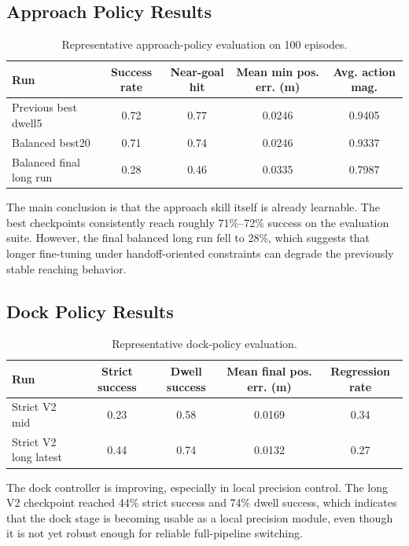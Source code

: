 \documentclass[11pt]{article}
\begin{document}
\subsection{Approach Policy Results}

\begin{table}[H]
\centering
\begin{tabularx}{\textwidth}{>{\raggedright\arraybackslash}p{} c c c c}
\toprule
Run & Success rate & Near-goal hit & Mean min pos. err. (m) & Avg. action mag. \\
\midrule
Previous best dwell5 & 0.72 & 0.77 & 0.0246 & 0.9405 \\
Balanced best20 & 0.71 & 0.74 & 0.0246 & 0.9337 \\
Balanced final long run & 0.28 & 0.46 & 0.0335 & 0.7987 \\
\bottomrule
\end{tabularx}
\caption{Representative approach-policy evaluation on 100 episodes.}
\end{table}

The main conclusion is that the approach skill itself is already learnable. The best checkpoints consistently reach roughly 71\%--72\% success on the evaluation suite. However, the final balanced long run fell to 28\%, which suggests that longer fine-tuning under handoff-oriented constraints can degrade the previously stable reaching behavior.

\subsection{Dock Policy Results}

\begin{table}[H]
\centering
\begin{tabularx}{\textwidth}{>{\raggedright\arraybackslash}p{} c c c c}
\toprule
Run & Strict success & Dwell success & Mean final pos. err. (m) & Regression rate \\
\midrule
Strict V2 mid & 0.23 & 0.58 & 0.0169 & 0.34 \\
Strict V2 long latest & 0.44 & 0.74 & 0.0132 & 0.27 \\
\bottomrule
\end{tabularx}
\caption{Representative dock-policy evaluation.}
\end{table}

The dock controller is improving, especially in local precision control. The long V2 checkpoint reached 44\% strict success and 74\% dwell success, which indicates that the dock stage is becoming usable as a local precision module, even though it is not yet robust enough for reliable full-pipeline switching.
\end{document}
